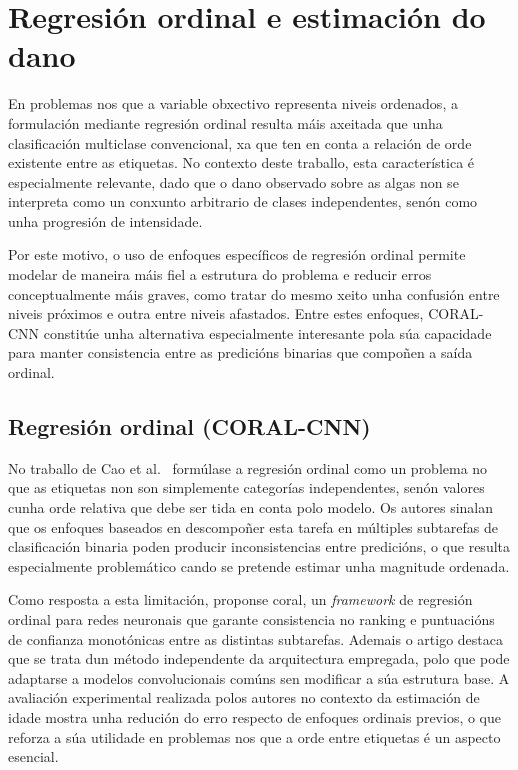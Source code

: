 \section{Regresión ordinal e estimación do dano}
En problemas nos que a variable obxectivo representa niveis ordenados, a formulación mediante
regresión ordinal resulta máis axeitada que unha clasificación multiclase convencional, xa que ten en
conta a relación de orde existente entre as etiquetas. No contexto deste traballo, esta característica
é especialmente relevante, dado que o dano observado sobre as algas non se interpreta como un
conxunto arbitrario de clases independentes, senón como unha progresión de intensidade.

Por este motivo, o uso de enfoques específicos de regresión ordinal permite modelar de maneira máis
fiel a estrutura do problema e reducir erros conceptualmente máis graves, como tratar do mesmo xeito
unha confusión entre niveis próximos e outra entre niveis afastados. Entre estes enfoques, CORAL-CNN \cite{articuloCoral}
constitúe unha alternativa especialmente interesante pola súa capacidade para manter consistencia entre
as predicións binarias que compoñen a saída ordinal.
\subsection{Regresión ordinal (CORAL-CNN)}
No traballo de Cao et al.~\cite{articuloCoral} formúlase a regresión ordinal como un problema no
que as etiquetas non son simplemente categorías independentes, senón valores cunha orde relativa que
debe ser tida en conta polo modelo. Os autores sinalan que os enfoques baseados en descompoñer esta
tarefa en múltiples subtarefas de clasificación binaria poden producir inconsistencias entre
predicións, o que resulta especialmente problemático cando se pretende estimar unha magnitude
ordenada.

Como resposta a esta limitación, proponse \gls{coral}, un \textit{framework} de regresión ordinal
para redes neuronais que garante consistencia no ranking e puntuacións de confianza monotónicas entre
as distintas subtarefas. Ademais o artigo destaca que se trata dun método independente da
arquitectura empregada, polo que pode adaptarse a modelos convolucionais comúns sen modificar a súa
estrutura base. A avaliación experimental realizada polos autores no contexto da estimación de idade
mostra unha redución do erro respecto de enfoques ordinais previos, o que reforza a súa utilidade en
problemas nos que a orde entre etiquetas é un aspecto esencial.


